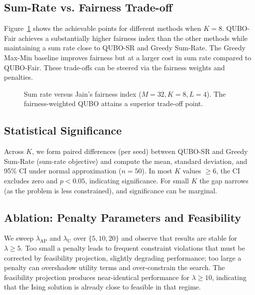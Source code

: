 {\subsection{Sum-Rate vs. Fairness Trade-off}
Figure~\ref{fig:tradeoff} shows the achievable points for different methods when $K=8$. QUBO-Fair achieves a substantially higher fairness index than the other methods while maintaining a sum rate close to QUBO-SR and Greedy Sum-Rate. The Greedy Max-Min baseline improves fairness but at a larger cost in sum rate compared to QUBO-Fair. These trade-offs can be steered via the fairness weights and penalties.

\begin{figure}[htbp]
\centering
{}
\caption{Sum rate versus Jain’s fairness index ($M=32, K=8, L=4$). The fairness-weighted QUBO attains a superior trade-off point.}
\label{fig:tradeoff}
\end{figure}

\subsection{Statistical Significance}
Across $K$, we form paired differences (per seed) between QUBO-SR and Greedy Sum-Rate (sum-rate objective) and compute the mean, standard deviation, and 95\% CI under normal approximation ($n=50$). In most $K$ values $\ge 6$, the CI excludes zero and $p<0.05$, indicating significance. For small $K$ the gap narrows (as the problem is less constrained), and significance can be marginal.

\subsection{Ablation: Penalty Parameters and Feasibility}
We sweep $\lambda_{\text{AP}}$ and $\lambda_{\text{U}}$ over $\{5,10,20\}$ and observe that results are stable for $\lambda\ge 5$. Too small a penalty leads to frequent constraint violations that must be corrected by feasibility projection, slightly degrading performance; too large a penalty can overshadow utility terms and over-constrain the search. The feasibility projection produces near-identical performance for $\lambda\ge 10$, indicating that the Ising solution is already close to feasible in that regime.

}
